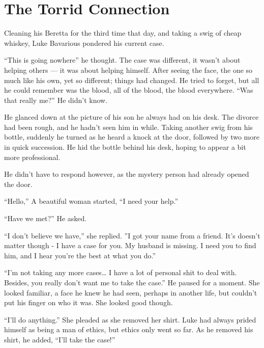 \chapter{The Torrid Connection}


Cleaning his Beretta for the third time that day, and taking a swig
of cheap whiskey, Luke Bavarious pondered his current case.



``This is going nowhere'' he thought. The case was
different, it wasn't about helping others --- it was
about helping himself. After seeing the face, the one so much like
his own, yet so different; things had changed. He tried to forget,
but all he could remember was the blood, all of the blood, the
blood everywhere. ``Was that really me?'' He didn't
know.



He glanced down at the picture of his son he always had on his
desk. The divorce had been rough, and he hadn't seen him in
while. Taking another swig from his bottle, suddenly he turned as
he heard a knock at the door, followed by two more in quick
succession. He hid the bottle behind his desk, hoping to appear a
bit more professional.



He didn't have to respond however, as the mystery person had
already opened the door.



``Hello,'' A beautiful woman started, ``I need your
help.''



``Have we met?'' He asked.



``I don't believe we have,'' she replied. ''I
got your name from a friend. It's doesn't matter though
- I have a case for you. My husband is missing. I need you to find
him, and I hear you're the best at what you do.''



``I'm not taking any more cases{\ldots} I have a lot of
personal shit to deal with. Besides, you really don't want me
to take the case.'' He paused for a moment. She looked
familiar, a face he knew he had seen, perhaps in another life, but
couldn't put his finger on who it was. She looked good
though.



``I'll do anything.'' She pleaded as she removed
her shirt. Luke had always prided himself as being a man of ethics,
but ethics only went so far. As he removed his shirt, he added,
``I'll take the case!''



